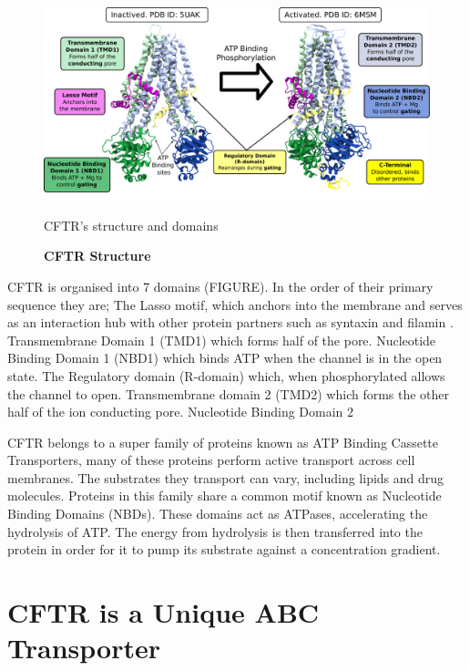 \begin{figure}
	\label{CFTR_structure_domains}
	\begin{center}
	\includegraphics[width=\textwidth]{figures/CFTR_structure.pdf}
	\end{center}
	\captionsetup{singlelinecheck = false, justification=raggedright}
	\caption[CFTR Structure] {\textbf{CFTR Structure}}{CFTR's structure and domains } 
\end{figure}
CFTR is organised into 7 domains (FIGURE). In the order of their primary sequence they are; The Lasso motif, which anchors into the membrane and serves as an interaction hub with other protein partners such as syntaxin and filamin \cite{}. Transmembrane Domain 1 (TMD1) which forms half of the pore. Nucleotide Binding Domain 1 (NBD1) which binds ATP when the channel is in the open state. The Regulatory domain (R-domain) which, when phosphorylated allows the channel to open. Transmembrane domain 2 (TMD2) which forms the other half of the ion conducting pore. Nucleotide Binding Domain 2 

CFTR belongs to a super family of proteins known as ATP Binding Cassette Transporters,  many of these proteins perform active transport across cell membranes. The substrates they transport can vary, including lipids and drug molecules. Proteins in this family share a common motif known as Nucleotide Binding Domains (NBDs). These domains act as ATPases, accelerating the hydrolysis of ATP. The energy from hydrolysis is then transferred into the protein in order for it to pump its substrate against a concentration gradient. 

\section{CFTR is a Unique ABC Transporter}

